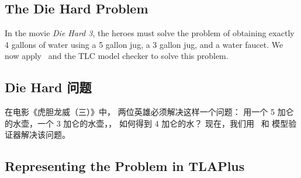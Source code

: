 
\begin{en}
\newpage
\vspace{-\baselineskip}%

\section{The Die Hard Problem} 

In the movie \emph{Die Hard 3}, the heroes must solve the problem of
obtaining exactly 4 gallons of water using a 5 gallon jug, a 3 gallon
jug, and a water faucet.  We now apply \tlaplus\ and the TLC
model checker to solve this problem.
\end{en}

\begin{ch}
\newpage
\vspace{-\baselineskip}%

\section{Die Hard 问题} 

在电影《虎胆龙威（三）》中，
两位英雄必须解决这样一个问题：
用一个 5 加仑的水壶，一个 3 加仑的水壶，，
如何得到 4 加仑的水？
现在，我们用 \tlaplus\ 和 \tlc{} 模型验证器解决该问题。
\end{ch}

\subsection{Representing the Problem in TLAPlus}%


